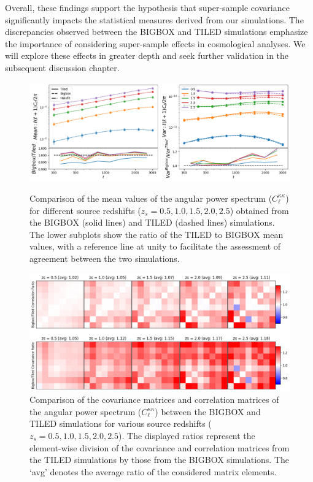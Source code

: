 Overall, these findings support the hypothesis that super-sample covariance significantly impacts the statistical measures derived from our simulations. The discrepancies observed between the BIGBOX and TILED simulations emphasize the importance of considering super-sample effects in cosmological analyses. We will explore these effects in greater depth and seek further validation in the subsequent discussion chapter.

\begin{figure}[p]
    \centering
    \includegraphics[width=\textwidth]{figures/results/cl_main.png}
    \caption[$C_\ell^{\kappa\kappa}$ Mean and Variance]{Comparison of the mean values of the angular power spectrum ($C^{\kappa\kappa}_{\ell}$) for different source redshifts ($z_s = 0.5, 1.0, 1.5, 2.0, 2.5$) obtained from the BIGBOX (solid lines) and TILED (dashed lines) simulations. The lower subplots show the ratio of the TILED to BIGBOX mean values, with a reference line at unity to facilitate the assessment of agreement between the two simulations.}
    \label{fig:cl_main}
    \vspace{2cm}
    \includegraphics[width=\textwidth]{figures/results/cl_cov.png}
    \caption[$C_\ell^{\kappa\kappa}$ Correlation and Covariance Ratio]{Comparison of the covariance matrices and correlation matrices of the angular power spectrum ($C^{\kappa\kappa}_{\ell}$) between the BIGBOX and TILED simulations for various source redshifts ($z_s = 0.5, 1.0, 1.5, 2.0, 2.5$). The displayed ratios represent the element-wise division of the covariance and correlation matrices from the TILED simulations by those from the BIGBOX simulations. The `avg' denotes the average ratio of the considered matrix elements.}
    \label{fig:cl_cov}
\end{figure}

